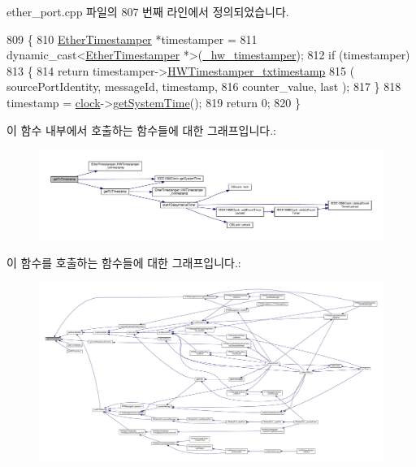 ether\+\_\+port.\+cpp 파일의 807 번째 라인에서 정의되었습니다.


\begin{DoxyCode}
809 \{
810     \hyperlink{class_ether_timestamper}{EtherTimestamper} *timestamper =
811         \textcolor{keyword}{dynamic\_cast<}\hyperlink{class_ether_timestamper}{EtherTimestamper} *\textcolor{keyword}{>}(\hyperlink{class_common_port_a6b964d49ce26b21cc984b14102973f87}{\_hw\_timestamper});
812     \textcolor{keywordflow}{if} (timestamper)
813     \{
814         \textcolor{keywordflow}{return} timestamper->\hyperlink{class_ether_timestamper_a82619058d136ce4314189f1c9db91914}{HWTimestamper\_txtimestamp}
815             ( sourcePortIdentity, messageId, timestamp,
816               counter\_value, last );
817     \}
818     timestamp = \hyperlink{class_common_port_aa2bc8731fa5aeb5b033feebc2b67258c}{clock}->\hyperlink{class_i_e_e_e1588_clock_a36929ce6b68ef7534184307e44f3796d}{getSystemTime}();
819     \textcolor{keywordflow}{return} 0;
820 \}
\end{DoxyCode}


이 함수 내부에서 호출하는 함수들에 대한 그래프입니다.\+:
\nopagebreak
\begin{figure}[H]
\begin{center}
\leavevmode
\includegraphics[width=350pt]{class_ether_port_aa89b02ea4c3b6edddaf69fbdb03a2fe1_cgraph}
\end{center}
\end{figure}




이 함수를 호출하는 함수들에 대한 그래프입니다.\+:
\nopagebreak
\begin{figure}[H]
\begin{center}
\leavevmode
\includegraphics[width=350pt]{class_ether_port_aa89b02ea4c3b6edddaf69fbdb03a2fe1_icgraph}
\end{center}
\end{figure}


